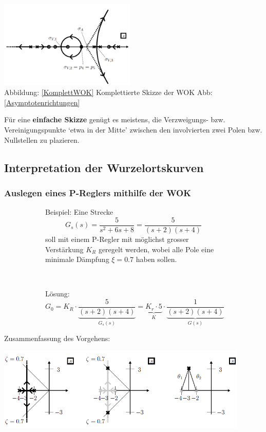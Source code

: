 \begin{enumerate}
\begin{multicols}{2}
\includegraphics[width=6.5cm]{./images/KomplettWOK.png}\\
Abbildung: \ref{KomplettWOK} {Komplettierte Skizze der WOK Abb: \ref{Asymptotenrichtungen}} \label{KomplettWOK}
\end{multicols}

\vspace{-0.5cm}

Für eine \textbf{einfache Skizze} genügt es meistens, die Verzweigungs- bzw. Vereinigungspunkte ‘etwa in der Mitte’ zwischen den involvierten zwei Polen bzw. Nullstellen zu plazieren.
\end{enumerate}

\subsection{Interpretation der Wurzelortskurven }

\subsubsection{Auslegen eines P-Reglers mithilfe der WOK }
\begin{figure}[h!]
	\begin{subfigure}[t]{8.5cm}
Beispiel: Eine Strecke \[G_s(s)=\frac{5}{s^2 + 6s +8}=\frac{5}{(s+2)(s+4)}\] soll mit einem P-Regler mit
 möglichst grosser Verstärkung $K_R$ geregelt werden, wobei alle Pole eine minimale
 Dämpfung $\xi = 0.7$ haben sollen.\\


	\end{subfigure}$\qquad$
	\begin{subfigure}[t]{10cm}
		Lösung:
		 \[G_0=K_R\cdot\underbrace{\frac{5}{(s+2)(s+4)}}_{G_s(s)}=\underbrace{K_r\cdot 5}_{K} \cdot\underbrace{\frac{1}{(s+2)(s+4)}}_{G(s)}\]
	\end{subfigure}
\end{figure}

Zusammenfassung des Vorgehens:\\
\begin{center}
    \includegraphics[width=12cm]{./images/PReglerBeispielWOK2.png}
\end{center}

